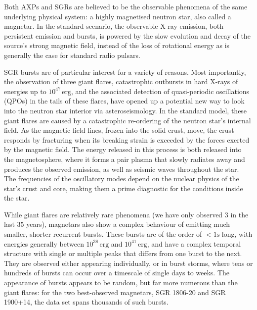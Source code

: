 \documentclass[12pt]{article}
\begin{document}
Both AXPs and SGRs are believed to be the observable phenomena of the same underlying physical system: a highly magnetised
neutron star, also called a magnetar. In the standard scenario, the observable X-ray emission, both persistent emission and bursts, 
is powered by the slow evolution and decay of the source's strong magnetic field, instead of the loss of rotational energy as 
is generally the case for standard radio pulsars. 

SGR bursts are of particular interest for a variety of reasons. Most importantly, the observation of three giant flares, catastrophic
outbursts in hard X-rays of energies up to $10^{47} \, \mathrm{erg}$, and the associated detection of quasi-periodic oscillations (QPOs)
in the tails of these flares, have opened up a potential new way to look into the neutron star interior via asteroseismology. In the standard 
model, these giant flares are caused by a catastrophic re-ordering of the neutron star's internal field. As the magnetic field lines, frozen into
the solid crust, move, the crust responds by fracturing when its breaking strain is exceeded by the forces exerted by the magnetic field.
The energy released in this process is both released into the magnetosphere, where it forms a pair plasma that slowly radiates away and
produces the observed emission, as well as seismic waves throughout the star. The frequencies of the oscillatory modes depend on
the nuclear physics of the star's crust and core, making them a prime diagnostic for the conditions inside the star.

While giant flares are relatively rare phenomena (we have only observed $3$ in the last $35$ years), magnetars also show a complex
behaviour of emitting much smaller, shorter recurrent bursts. These bursts are of the order of $<1\mathrm{s}$ long, with energies
generally between $10^{38}\,\mathrm{erg}$ and $10^{41}\,\mathrm{erg}$, and have a complex temporal structure with single or
multiple peaks that differs from one burst to the next. They are observed either appearing individually, or in burst 
storms, where tens or hundreds of bursts can occur over a timescale of single days to weeks. The appearance of bursts appears to be
random, but far more numerous than the giant flares: for the two best-observed magnetars, SGR 1806-20 and SGR 1900+14, the
data set spans thousands of such bursts. 
\end{document}

